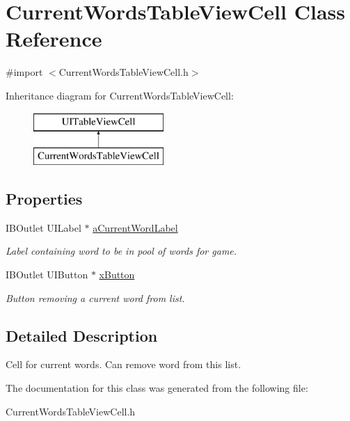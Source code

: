 \hypertarget{interface_current_words_table_view_cell}{\section{Current\+Words\+Table\+View\+Cell Class Reference}
\label{interface_current_words_table_view_cell}
}


{\ttfamily \#import $<$Current\+Words\+Table\+View\+Cell.\+h$>$}

Inheritance diagram for Current\+Words\+Table\+View\+Cell\+:\begin{figure}[H]
\begin{center}
\leavevmode
\includegraphics[height=2.000000cm]{interface_current_words_table_view_cell}
\end{center}
\end{figure}
\subsection*{Properties}
\begin{DoxyCompactItemize}
\item 
\hypertarget{interface_current_words_table_view_cell_a2e4ece006fb6945c36f14bce351c65fa}{I\+B\+Outlet U\+I\+Label $\ast$ \hyperlink{interface_current_words_table_view_cell_a2e4ece006fb6945c36f14bce351c65fa}{a\+Current\+Word\+Label}}\label{interface_current_words_table_view_cell_a2e4ece006fb6945c36f14bce351c65fa}

\begin{DoxyCompactList}\small\item\em Label containing word to be in pool of words for game. \end{DoxyCompactList}\item 
\hypertarget{interface_current_words_table_view_cell_a0f09b850609dc4f0a9ed74aa608d76ed}{I\+B\+Outlet U\+I\+Button $\ast$ \hyperlink{interface_current_words_table_view_cell_a0f09b850609dc4f0a9ed74aa608d76ed}{x\+Button}}\label{interface_current_words_table_view_cell_a0f09b850609dc4f0a9ed74aa608d76ed}

\begin{DoxyCompactList}\small\item\em Button removing a current word from list. \end{DoxyCompactList}\end{DoxyCompactItemize}


\subsection{Detailed Description}
Cell for current words. Can remove word from this list. 

The documentation for this class was generated from the following file\+:\begin{DoxyCompactItemize}
\item 
Current\+Words\+Table\+View\+Cell.\+h\end{DoxyCompactItemize}

